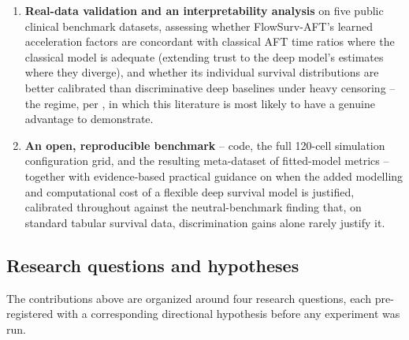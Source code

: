 \documentclass[11pt]{article}
\begin{document}
\begin{enumerate}
    calibration instruments (D-calibration; the integrated calibration
    index) alongside a single, pre-registered concordance variant to
    avoid the metric-selection bias \citet{sonabend2022chacking}
    terms "C-hacking."
  \item \textbf{Real-data validation and an interpretability analysis}
    on five public clinical benchmark datasets, assessing whether
    FlowSurv-AFT's learned acceleration factors are concordant with
    classical AFT time ratios where the classical model is adequate
    (extending trust to the deep model's estimates where they diverge),
    and whether its individual survival distributions are better
    calibrated than discriminative deep baselines under heavy censoring
    -- the regime, per \citet{burk2024neutral}, in which this literature
    is most likely to have a genuine advantage to demonstrate.
  \item \textbf{An open, reproducible benchmark} -- code, the full
    120-cell simulation configuration grid, and the resulting
    meta-dataset of fitted-model metrics -- together with
    evidence-based practical guidance on when the added modelling and
    computational cost of a flexible deep survival model is justified,
    calibrated throughout against the neutral-benchmark finding that,
    on standard tabular survival data, discrimination gains alone
    rarely justify it.
\end{enumerate}

\subsection{Research questions and hypotheses}
\label{sec:rq}

The contributions above are organized around four research questions,
each pre-registered with a corresponding directional hypothesis before
any experiment was run.
\end{document}
